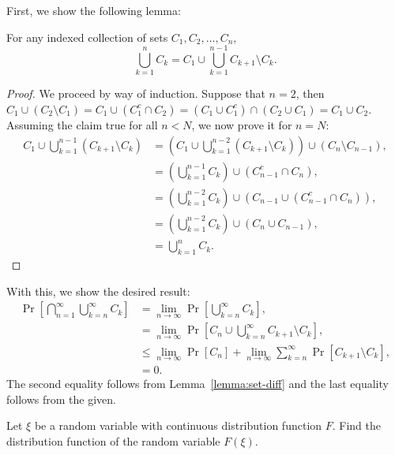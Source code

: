 \begin{solution}
    First, we show the following lemma:
    \begin{lemma}\label{lemma:set-diff}
        For any indexed collection of sets $C_1,C_2,\ldots,C_n$, \[
            \bigcup_{k=1}^n C_k = C_1 \cup \bigcup_{k=1}^{n-1} C_{k+1} \setminus C_k.  
        \]
    \end{lemma}
    \begin{proof}
        We proceed by way of induction. Suppose that $n=2$, then $C_1 \cup (C_2 \setminus C_1) = C_1 \cup (C_1^c \cap C_2) = (C_1 \cup C_1^c) \cap (C_2 \cup C_1) = C_1 \cup C_2$. Assuming the claim true for all $n < N$, we now prove it for $n=N$:
        \begin{align*}
            C_1 \cup \bigcup_{k=1}^{n-1} (C_{k+1} \setminus C_k) &= \left(C_1 \cup \bigcup_{k=1}^{n-2} (C_{k+1} \setminus C_k)\right)\cup (C_n\setminus C_{n-1}), \\
            &= \left(\bigcup_{k=1}^{n-1} C_k \right) \cup (C_{n-1}^c \cap C_n), \tag{by ind. hyp.}\\
            &= \left(\bigcup_{k=1}^{n-2} C_k\right) \cup \left(C_{n-1} \cup (C_{n-1}^c \cap C_n)\right), \\
            &= \left(\bigcup_{k=1}^{n-2} C_k\right) \cup (C_n \cup C_{n-1}), \\
            &= \bigcup_{k=1}^n C_k.
        \end{align*}
    \end{proof}
    With this, we show the desired result:
    \begin{align*}
        \Pr\left[\bigcap_{n=1}^\infty \bigcup_{k=n}^\infty C_k\right] &= \lim_{n\to\infty} \Pr\left[\bigcup_{k=n}^\infty C_k\right], \\
        &= \lim_{n\to\infty} \Pr\left[C_n \cup \bigcup_{k=n}^\infty C_{k+1} \setminus C_k\right], \\
        &\leq \lim_{n\to\infty} \Pr[C_n] + \lim_{n\to\infty} \sum_{k=n}^\infty \Pr[C_{k+1} \setminus C_k], \\
        &= 0.
    \end{align*}
    The second equality follows from Lemma~\ref{lemma:set-diff} and the last equality follows from the given.
\end{solution}
\begin{problem}{15}
    Let $\xi$ be a random variable with continuous distribution function $F$. Find the distribution function of the random variable $F(\xi)$.
\end{problem}
